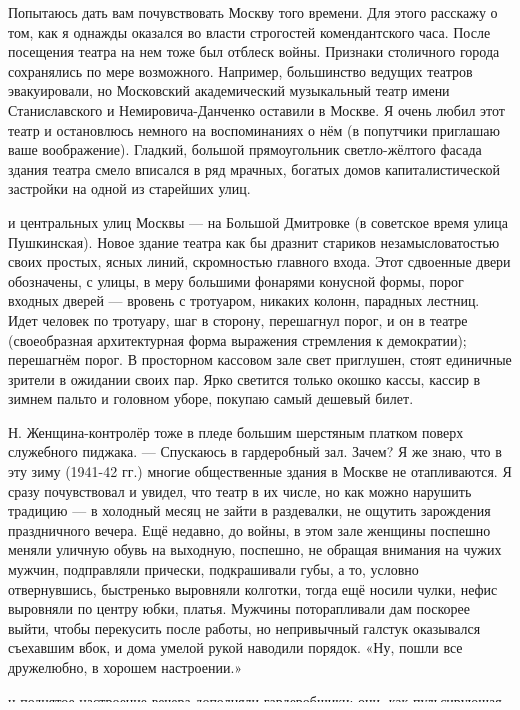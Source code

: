 \label{224-1}
Попытаюсь дать вам почувствовать Москву того времени. Для этого расскажу о том, как я однажды оказался во власти строгостей комендантского часа. После посещения театра на нем тоже был отблеск войны. Признаки столичного города сохранялись по мере возможного. Например, большинство ведущих театров эвакуировали, но Московский академический музыкальный театр имени Станиславского и Немировича-Данченко оставили в Москве. Я очень любил этот театр и остановлюсь немного на воспоминаниях о нём (в попутчики приглашаю ваше воображение). Гладкий, большой прямоугольник светло-жёлтого фасада здания театра смело вписался в ряд мрачных, богатых домов капиталистической застройки на одной из старейших улиц.

\label{225-1}
и центральных улиц Москвы — на Большой Дмитровке (в советское время улица Пушкинская). Новое здание театра как бы дразнит стариков незамысловатостью своих простых, ясных линий, скромностью главного входа. Этот сдвоенные двери обозначены, с улицы, в меру большими фонарями конусной формы, порог входных дверей — вровень с тротуаром, никаких колонн, парадных лестниц. Идет человек по тротуару, шаг в сторону, перешагнул порог, и он в театре (своеобразная архитектурная форма выражения стремления к демократии); перешагнём порог. В просторном кассовом зале свет приглушен, стоят единичные зрители в ожидании своих пар. Ярко светится только окошко кассы, кассир в зимнем пальто и головном уборе, покупаю самый дешевый билет.

\label{226-1}
Н. Женщина-контролёр тоже в пледе большим шерстяным платком поверх служебного пиджака. — Спускаюсь в гардеробный зал. Зачем? Я же знаю, что в эту зиму (1941-42 гг.) многие общественные здания в Москве не отапливаются. Я сразу почувствовал и увидел, что театр в их числе, но как можно нарушить традицию — в холодный месяц не зайти в раздевалки, не ощутить зарождения праздничного вечера. Ещё недавно, до войны, в этом зале женщины поспешно меняли уличную обувь на выходную, поспешно, не обращая внимания на чужих мужчин, подправляли прически, подкрашивали губы, а то, условно отвернувшись, быстренько выровняли колготки, тогда ещё носили чулки, нефис выровняли по центру юбки, платья. Мужчины поторапливали дам поскорее выйти, чтобы перекусить после работы, но непривычный галстук оказывался съехавшим вбок, и дома умелой рукой наводили порядок. «Ну, пошли все дружелюбно, в хорошем настроении.»

\label{227-1}
н поднятое настроение вечера дополняли гардеробщики: они, как пульсирующая жила, протянутая вдоль длинного раздевочного стола, заученно метались между зрителями и вешалками: они старались побыстрее вручить номерок и, по возможности, бинокль. театральная публика, разогретая своим, несколько сумбурным, приготовлением к встрече с искусством, постепенно переместилась в большое фойе, где вход в зрительный зал, медленно прогуливаясь по периметру фойе, зрители с невидимым нетерпением ждали первого звонка. театральный звонок - это запоминающаяся кульминация надежд актёров и зрителей.

